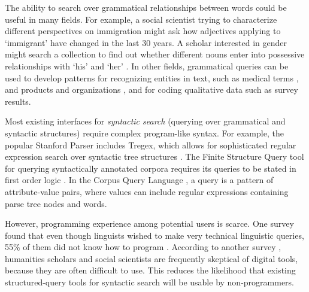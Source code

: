 The ability to search over grammatical relationships between words could be useful in many fields. For example, a social scientist trying to characterize different perspectives on immigration might ask how adjectives applying to `immigrant' have changed in the last 30 years. A scholar interested in gender might search a collection to find out whether different nouns enter into possessive relationships with `his' and `her' \cite{muralidharan2013supporting}. In other fields, grammatical queries can be used to develop patterns for recognizing entities in text, such as medical terms \cite{hirschman2005overview,maclean2013identifying}, and  products and organizations \cite{culotta2005reducing}, and for coding qualitative data such as survey results.

Most existing interfaces for \emph{syntactic search} (querying over grammatical and syntactic structures) require complex program-like syntax. For example, the popular Stanford Parser includes Tregex, which allows for sophisticated regular expression search over syntactic tree structures \cite{levy2006tregex}.
The Finite Structure Query tool for querying syntactically annotated corpora requires its queries to be stated in first order logic \cite{kepser2003finite}. In the Corpus Query Language \cite{jakubicek2010fast}, a query is a pattern of attribute-value pairs, where values can include regular expressions containing parse tree nodes and words.

However, programming experience among potential users is scarce. One survey found that even though linguists wished to make very technical  linguistic queries, 55\% of them did not know how to program \cite{soehn2008requirements}. According to another survey \cite{gibbs_building_2012}, humanities scholars and social scientists are frequently skeptical of digital tools, because they are often difficult to use. This reduces the likelihood that existing structured-query tools for syntactic search will be usable by non-programmers.


